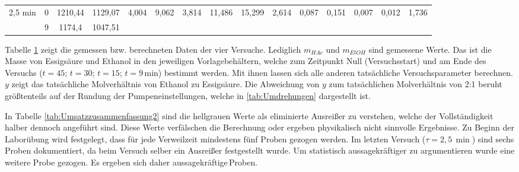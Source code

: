 \documentclass[12pt,liststotoc]{report}
\begin{document}
\begin{landscape}
\begin{table}[htbp]
\begin{tabular}{ccccccccccccccc}
    \midrule
    \multirow{2}[2]{*}{2,5 min} & 0     & 1210,44 & 1129,07 & \multirow{2}[2]{*}{4,004} & \multirow{2}[2]{*}{9,062} & \multirow{2}[2]{*}{3,814} & \multirow{2}[2]{*}{11,486} & \multirow{2}[2]{*}{15,299} & \multirow{2}[2]{*}{2,614} & \multirow{2}[2]{*}{0,087} & \multirow{2}[2]{*}{0,151} & \multirow{2}[2]{*}{0,007} & \multirow{2}[2]{*}{0,012} & \multirow{2}[2]{*}{1,736} \\
          & 9     & 1174,4 & 1047,51 &       &       &       &       &       &       &       &       &       &       &  \\
    \bottomrule
    \end{tabular}%
  \label{tab:Umsatzzusammenfassung}%
\end{table}%
\newline
Tabelle \ref{tab:Umsatzzusammenfassung} zeigt die gemessen bzw. berechneten Daten der vier Versuche. Lediglich $m_{HAc}$ und $m_{EtOH}$ sind gemessene Werte. Das ist die Masse von Essigsäure und Ethanol in den jeweiligen Vorlagebehältern, welche zum Zeitpunkt Null (Versuchsstart) und am Ende des Versuchs ($t=45$; $t=30$; $t=15$; $t=9\,\text{min}$) bestimmt werden. Mit ihnen lassen sich alle anderen tatsächliche Versuchsparameter berechnen. $y$ zeigt das tatsächliche Molverhältnis von Ethanol zu Essigsäure. Die Abweichung von $y$ zum tatsächlichen Molverhältnis von 2:1 beruht größtenteils auf der Rundung der Pumpeneinstellungen, welche in \ref{tab:Umdrehungen} dargestellt ist. 

\end{landscape}

In Tabelle \ref{tab:Umsatzzusammenfassung2} sind die hellgrauen Werte als eliminierte Ausreißer zu verstehen, welche der Vollständigkeit halber dennoch angeführt sind. Diese Werte verfälschen die Berechnung oder ergeben physikalisch nicht sinnvolle Ergebnisse. Zu Beginn der Laborübung wird festgelegt, dass für jede Verweilzeit mindestens fünf Proben gezogen werden. Im letzten Versuch ($\tau = 2,5\,\min$) sind sechs Proben dokumentiert, da beim Versuch selber ein Ausreißer festgestellt wurde. Um statistisch aussagekräftiger zu argumentieren wurde eine weitere Probe gezogen. Es ergeben sich daher \glqq aussagekräftige\grqq\,Proben.
\end{document}
